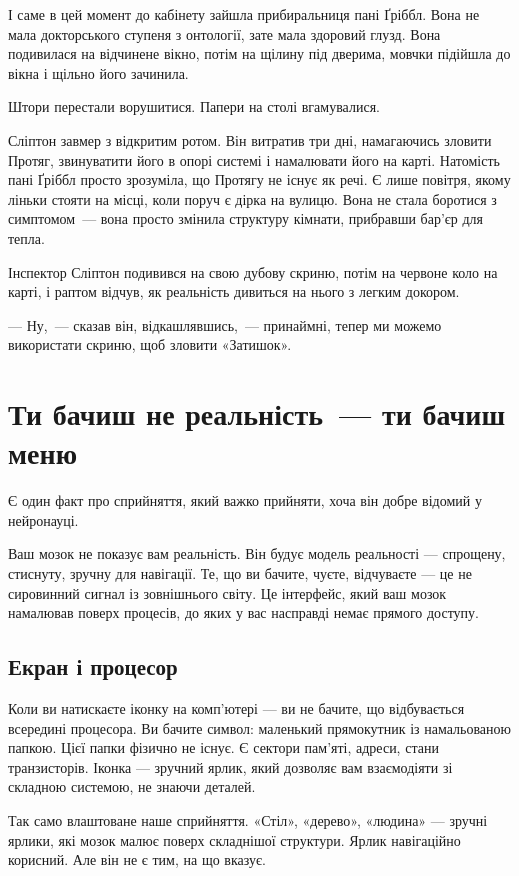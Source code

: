 \documentclass[12pt, a4paper, openany]{book}
\begin{document}
\begin{terrybox}
І саме в цей момент до кабінету зайшла прибиральниця пані Ґріббл. Вона не мала докторського ступеня з онтології, зате мала здоровий глузд. Вона подивилася на відчинене вікно, потім на щілину під дверима, мовчки підійшла до вікна і щільно його зачинила.

Штори перестали ворушитися. Папери на столі вгамувалися.

Сліптон завмер з відкритим ротом. Він витратив три дні, намагаючись зловити Протяг, звинуватити його в опорі системі і намалювати його на карті. Натомість пані Ґріббл просто зрозуміла, що Протягу не існує як речі. Є лише повітря, якому ліньки стояти на місці, коли поруч є дірка на вулицю. Вона не стала боротися з симптомом~--- вона просто змінила структуру кімнати, прибравши бар'єр для тепла.

Інспектор Сліптон подивився на свою дубову скриню, потім на червоне коло на карті, і раптом відчув, як реальність дивиться на нього з легким докором.

\medskip
--- Ну,~--- сказав він, відкашлявшись,~--- принаймні, тепер ми можемо використати скриню, щоб зловити «Затишок».
\end{terrybox}

\chapter{Ти бачиш не реальність~--- ти бачиш меню}

Є один факт про сприйняття, який важко прийняти, хоча він добре відомий у нейронауці.

Ваш мозок не показує вам реальність. Він будує модель реальності --- спрощену, стиснуту, зручну для навігації. Те, що ви бачите, чуєте, відчуваєте --- це не сировинний сигнал із зовнішнього світу. Це інтерфейс, який ваш мозок намалював поверх процесів, до яких у вас насправді немає прямого доступу.

\section{Екран і процесор}

Коли ви натискаєте іконку на комп'ютері --- ви не бачите, що відбувається всередині процесора. Ви бачите символ: маленький прямокутник із намальованою папкою. Цієї папки фізично не існує. Є сектори пам'яті, адреси, стани транзисторів. Іконка --- зручний ярлик, який дозволяє вам взаємодіяти зі складною системою, не знаючи деталей.

Так само влаштоване наше сприйняття. «Стіл», «дерево», «людина» --- зручні ярлики, які мозок малює поверх складнішої структури. Ярлик навігаційно корисний. Але він не є тим, на що вказує.
\end{document}
